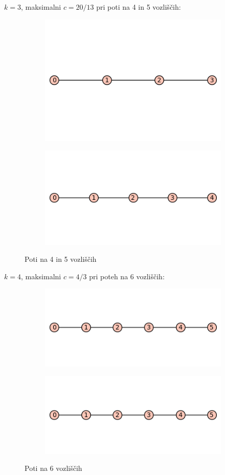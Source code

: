 \documentclass[12pt, a4paper]{article}
\begin{document}
$k=3$, maksimalni $c=20/13$ pri poti na 4 in 5 vozliščih:
\begin{figure}[!htb]
\centering
\begin{subfigure}{0.5\textwidth}
  \centering
  \includegraphics[width=0.5\linewidth]{4-pot}
\end{subfigure}%
\begin{subfigure}{0.5\textwidth}
  \centering
  \includegraphics[width=0.5\linewidth]{5-pot}
\end{subfigure}
\caption{Poti na 4 in 5 vozliščih}
\label{fig:test}
\end{figure}

$k=4$, maksimalni $c=4/3$ pri poteh na 6 vozliščih:
\begin{figure}[!htb]
\centering
\begin{subfigure}{0.5\textwidth}
  \centering
  \includegraphics[width=0.5\linewidth]{6-pot}
\end{subfigure}%
\begin{subfigure}{0.5\textwidth}
  \centering
  \includegraphics[width=0.5\linewidth]{6-pot}
\end{subfigure}
\caption{Poti na 6 vozliščih}
\label{fig:test}
\end{figure}
\end{document}

